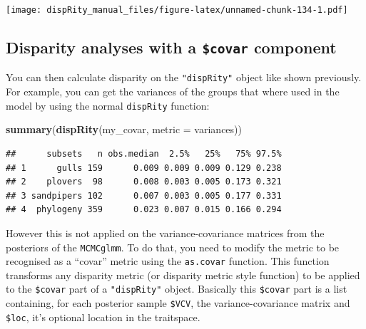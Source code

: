 \documentclass[
]{book}
\newenvironment{Shaded}{\begin{snugshade}}{\end{snugshade}}
\newcommand{\CommentTok}[1]{\textcolor[rgb]{0.56,0.35,0.01}{\textit{#1}}}
\newcommand{\DataTypeTok}[1]{\textcolor[rgb]{0.13,0.29,0.53}{#1}}
\newcommand{\DecValTok}[1]{\textcolor[rgb]{0.00,0.00,0.81}{#1}}
\newcommand{\KeywordTok}[1]{\textcolor[rgb]{0.13,0.29,0.53}{\textbf{#1}}}
\newcommand{\NormalTok}[1]{#1}
\newcommand{\OperatorTok}[1]{\textcolor[rgb]{0.81,0.36,0.00}{\textbf{#1}}}
\newcommand{\StringTok}[1]{\textcolor[rgb]{0.31,0.60,0.02}{#1}}
\begin{document}
\texttt{[image: dispRity\_manual\_files/figure-latex/unnamed-chunk-134-1.pdf]}

\hypertarget{disparity-analyses-with-a-covar-component}{%
\subsection{\texorpdfstring{Disparity analyses with a \texttt{\$covar} component}{Disparity analyses with a \$covar component}}\label{disparity-analyses-with-a-covar-component}}

You can then calculate disparity on the \texttt{"dispRity"} object like shown previously.
For example, you can get the variances of the groups that where used in the model by using the normal \texttt{dispRity} function:

\begin{Shaded}
\begin{Highlighting}[]
\KeywordTok{summary}\NormalTok{(}\KeywordTok{dispRity}\NormalTok{(my\_covar, }\DataTypeTok{metric =}\NormalTok{ variances))}
\end{Highlighting}
\end{Shaded}

\begin{verbatim}
##      subsets   n obs.median  2.5%   25%   75% 97.5%
## 1      gulls 159      0.009 0.009 0.009 0.129 0.238
## 2    plovers  98      0.008 0.003 0.005 0.173 0.321
## 3 sandpipers 102      0.007 0.003 0.005 0.177 0.331
## 4  phylogeny 359      0.023 0.007 0.015 0.166 0.294
\end{verbatim}

However this is not applied on the variance-covariance matrices from the posteriors of the \texttt{MCMCglmm}.
To do that, you need to modify the metric to be recognised as a ``covar'' metric using the \texttt{as.covar} function.
This function transforms any disparity metric (or disparity metric style function) to be applied to the \texttt{\$covar} part of a \texttt{"dispRity"} object.
Basically this \texttt{\$covar} part is a list containing, for each posterior sample \texttt{\$VCV}, the variance-covariance matrix and \texttt{\$loc}, it's optional location in the traitspace.

\begin{Shaded}
\end{Shaded}
\end{document}
